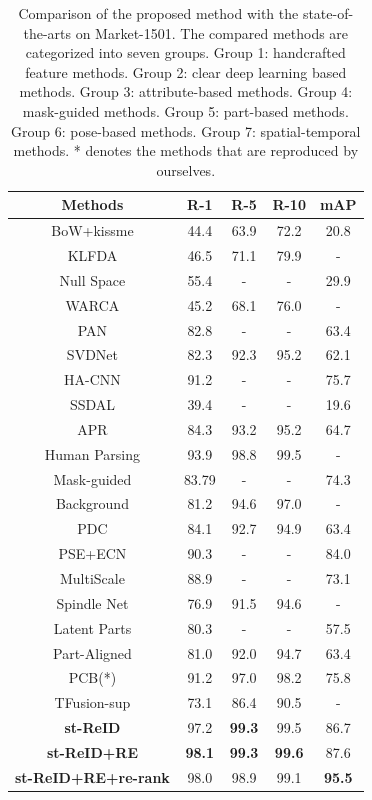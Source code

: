 \documentclass[letterpaper]{article} %
\begin{document}
\begin{table}
\begin{center}
\begin{tabular}{c|c|c|c|c}
\hline
Methods &R-1&R-5&R-10&mAP \\
\hline
BoW+kissme&44.4&63.9&72.2&20.8\\
KLFDA&46.5&71.1&79.9&-\\
Null Space&55.4&-&-&29.9\\
WARCA &45.2&68.1&76.0&-\\
\hline
PAN&82.8&-&-&63.4\\
SVDNet&82.3&92.3&95.2&62.1\\
HA-CNN&91.2&-&-&75.7\\
\hline
SSDAL&39.4&-&-&19.6\\
APR&84.3&93.2&95.2&64.7\\
\hline
Human Parsing&93.9&98.8&99.5&-\\
Mask-guided&83.79&-&-&74.3\\
Background&81.2&94.6&97.0&-\\
\hline
PDC &84.1&92.7&94.9&63.4\\
PSE+ECN&90.3&-&-&84.0\\
\hline
MultiScale&88.9&-&-&73.1\\
Spindle Net &76.9&91.5&94.6&-\\
Latent Parts&80.3&-&-&57.5\\
Part-Aligned&81.0&92.0&94.7&63.4\\
PCB(*) &91.2&97.0&98.2&75.8\\
\hline
TFusion-sup&73.1&86.4&90.5&-\\
\hline
\textbf{st-ReID}&97.2&\textbf{99.3}&99.5&86.7\\
\textbf{st-ReID+RE}&\textbf{98.1}&\textbf{99.3}&\textbf{99.6}&87.6\\
\textbf{st-ReID+RE+re-rank}&98.0&98.9&99.1&\textbf{95.5}\\
\hline
\end{tabular}
\end{center}
\caption{Comparison of the proposed method with the state-of-the-arts on Market-1501. The compared methods are categorized into seven groups. Group 1: handcrafted feature methods. Group 2: clear deep learning based methods. Group 3: attribute-based methods. Group 4: mask-guided methods. Group 5: part-based methods. Group 6: pose-based methods. Group 7: spatial-temporal methods. * denotes the methods that are reproduced by ourselves.}\label{tab:market1501}
\end{table}
\end{document}
